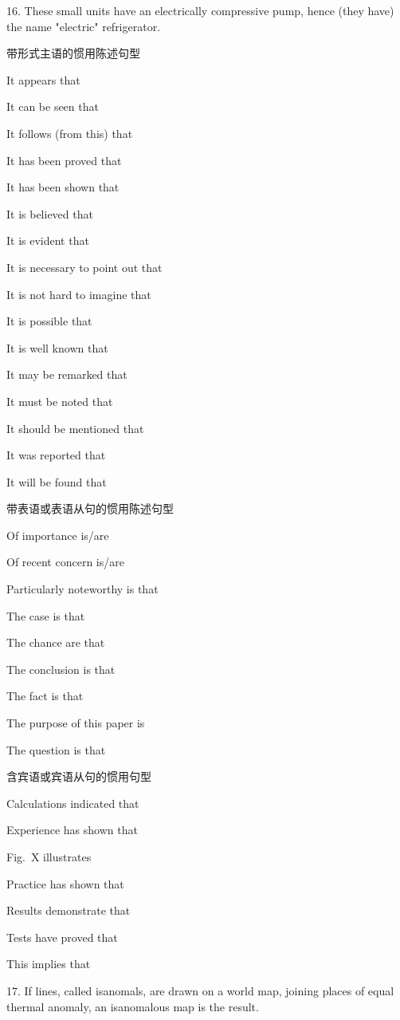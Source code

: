 \documentclass[a4paper,twocolumn,10pt]{article}
\begin{document}
\begin{CJK}{UTF8}{gkai}
16. These small units have an electrically compressive pump,
hence (they have) the name "electric" refrigerator.

\begin{framed}
带形式主语的惯用陈述句型

It appears that

It can be seen that

It follows (from this) that

It has been proved that

It has been shown that

It is believed that

It is evident that

It is necessary to point out that

It is not hard to imagine that

It is possible that

It is well known that

It may be remarked that

It must be noted that

It should be mentioned that

It was reported that

It will be found that

带表语或表语从句的惯用陈述句型

Of importance is/are

Of recent concern is/are

Particularly noteworthy is that

The case is that

The chance are that

The conclusion is that

The fact is that

The purpose of this paper is

The question is that

含宾语或宾语从句的惯用句型

Calculations indicated that

Experience has shown that

Fig.~X illustrates

Practice has shown that

Results demonstrate that

Tests have proved that

This implies that
\end{framed}

17. If lines, called isanomals, are drawn on a world map, joining places
of equal thermal anomaly, an isanomalous map is the result.


\end{CJK}
\end{document}
